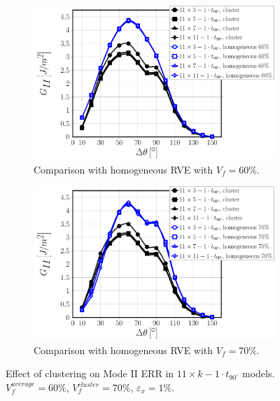 \documentclass[review]{elsarticle}
\begin{document}
\begin{figure}[!h]
\centering
    \begin{subfigure}[b]{0.475\textwidth}
        \includegraphics[width=\textwidth]{11xk-1t90-vf60-GII.pdf}
        \caption{Comparison with homogeneous RVE with $V_{f}=60\%$.}\label{subfig:cluster1t9011xkModeII60}
    \end{subfigure}\quad
    \begin{subfigure}[b]{0.475\textwidth}
        \includegraphics[width=\textwidth]{11xk-1t90-vf70-GII.pdf}
        \caption{Comparison with homogeneous RVE with $V_{f}=70\%$.}\label{subfig:cluster1t9011xkModeII70}
    \end{subfigure}

\caption{Effect of clustering on Mode II ERR in $11\times k-1\cdot t_{90^{\circ}}$ models. $V^{average}_{f}=60\%$, $V^{cluster}_{f}=70\%$, $\varepsilon_{x}=1\%$.}\label{fig:cluster1t9011xkModeII}
\end{figure}
\end{document}
